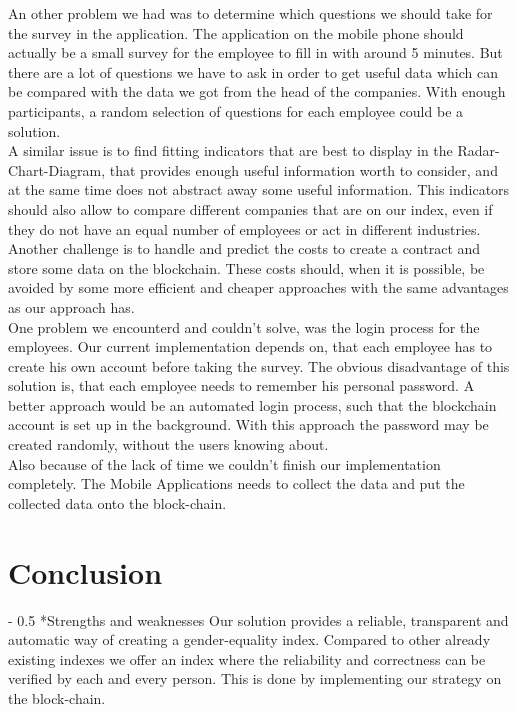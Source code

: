 \documentclass[portrait,a4paper]{article}
\makeatletter
\renewcommand\paragraph{\@startsection{paragraph}{4}{0mm}%
	{-\baselineskip}%
	{0.5\baselineskip}%
	{\normalfont\bfseries}%
}%
\makeatother
\begin{document}
		An other problem we had was to determine which questions we should take for the survey in the application. 
		The application on the mobile phone should actually be a small survey for the employee to fill in with around 
		5 minutes. But there are a lot of questions we have to ask in order to get useful data which can be 
		compared with the data we got from the head of the companies. With enough participants, a random selection of questions 		for each employee could be a solution.\\
		
		A similar issue is to find fitting indicators that are best to display in the Radar-Chart-Diagram, that provides
		enough useful information worth to consider, and at the same time does not abstract away some useful information.
		This indicators should also allow to compare different companies that are on our index, even if they do not have
		an equal number of employees or act in different industries.\\
		
		Another challenge is to handle and predict the costs to create a contract and store some data on the blockchain.
		These costs should, when it is possible, be avoided by some more efficient and cheaper approaches with
		the same advantages as our approach has.\\
		
		One problem we encounterd and couldn't solve, was the login process for the employees. 
		Our current implementation depends on, that each employee has to create his own account before taking the survey.
		The obvious disadvantage of this solution is, that each employee needs to remember his personal password. 
		A better approach would be an automated login process, such that the blockchain account is set up in the
		background. With this approach the password may be created randomly, without the users knowing about.\\

		Also because of the lack of time we couldn't finish our implementation completely. 
		The Mobile Applications needs to collect the data and put the collected data onto the block-chain.


\section{Conclusion}
	\paragraph*{Strengths and weaknesses}
		Our solution provides a reliable, transparent and automatic way of creating a gender-equality index. 
		Compared to other already existing indexes we offer an index where the reliability and correctness 
		can be verified by each and every person. This is done by implementing our strategy on the block-chain.
		
\end{document}

